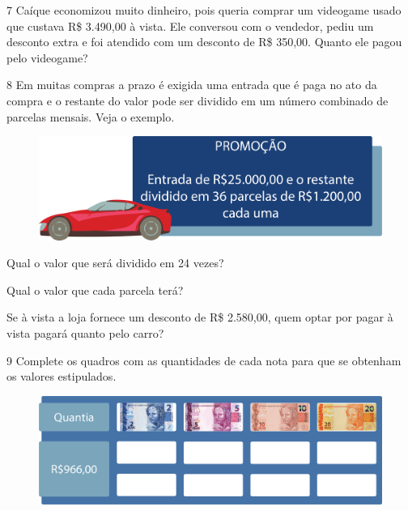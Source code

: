 \num{7} Caíque economizou muito dinheiro, pois queria comprar um videogame usado
que custava R\$ 3.490,00 à vista. Ele conversou com o vendedor, pediu
um desconto extra e foi atendido com um desconto de R\$ 350,00. Quanto ele pagou pelo videogame?


\num{8} Em muitas compras a prazo é exigida uma entrada que é paga no ato da
compra e o restante do valor pode ser dividido em um número combinado de
parcelas mensais. Veja o exemplo.

\begin{figure}[htpb!]
\centering
\includegraphics[width=\textwidth]{./media/image68.png}
\end{figure}

\pagebreak
\begin{escolha}
\item Qual o valor que será dividido em 24 vezes?


\item Qual o valor que cada parcela terá?


\item Se à vista a loja fornece um desconto de R\$ 2.580,00, quem optar por
  pagar à vista pagará quanto pelo carro?

\end{escolha}


\num{9}  Complete os quadros com as quantidades de cada nota para que se
obtenham os valores estipulados.

\begin{figure}[htpb!]
\centering
\includegraphics[width=\textwidth]{./media/image69.png}
\end{figure}

